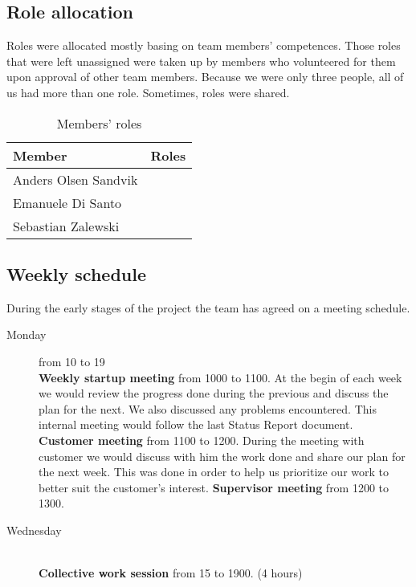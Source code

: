 \subsection{Role allocation}
Roles were allocated mostly basing on team members' competences.
Those roles that were left unassigned were taken up by members who volunteered for them upon approval of other team members.
Because we were only three people, all of us had more than one role. Sometimes, roles were shared.

\begin{table}
\begin{center}
\begin{tabular}{ | l | l | }
  \hline
  Member & Roles \\
  \hline\noalign{\smallskip}\noalign{\smallskip}\hline
  Anders Olsen Sandvik  &  \\
  Emanuele Di Santo     &  \\
  Sebastian Zalewski    &  \\
  \hline
\end{tabular}
\end{center}
\caption{Members' roles}
\label{table:roles}
\end{table}

\subsection{Weekly schedule}
During the early stages of the project the team has agreed on a meeting schedule.

\begin{description}
\item[Monday] \hfill from 10 to 19 \\
\textbf{Weekly startup meeting} from 1000 to 1100.\newline
At the begin of each week we would review the progress done during the previous and discuss the plan for the next.
We also discussed any problems encountered.
This internal meeting would follow the last Status Report document.
\textbf{Customer meeting} from 1100 to 1200.\newline
During the meeting with customer we would discuss with him the work done and share our plan for the next week.
This was done in order to help us prioritize our work to better suit the customer's interest.
\textbf{Supervisor meeting} from 1200 to 1300.
\item[Wednesday] \hfill \\
\textbf{Collective work session} from 15 to 1900. (4 hours)
\end{description}

